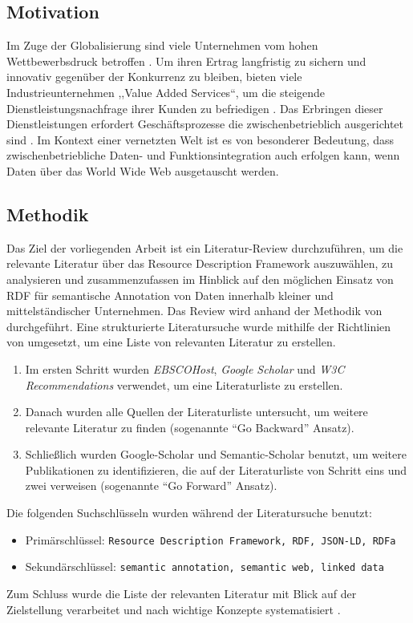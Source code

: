 \documentclass[../main.tex]{subfiles}
\begin{document}
\subsection{Motivation}
Im Zuge der Globalisierung sind viele Unternehmen vom hohen Wettbewerbsdruck betroffen \autocite[vgl.][]{alt2013handbuch}. Um ihren Ertrag langfristig zu sichern und innovativ gegenüber der Konkurrenz zu bleiben, bieten viele Industrieunternehmen ,,Value Added Services``, um die steigende Dienstleistungsnachfrage ihrer Kunden zu befriedigen \autocite[vgl.][S. 4]{Meffert2015}. Das Erbringen dieser Dienstleistungen erfordert Geschäftsprozesse die zwischenbetrieblich ausgerichtet sind \autocite[vgl.][S.19]{fleisch2001netzwerkunternehmen}. Im Kontext einer vernetzten Welt \autocite[vgl.][]{bmwi2013} ist es von besonderer Bedeutung, dass zwischenbetriebliche Daten- und Funktionsintegration auch erfolgen kann, wenn Daten über das World Wide Web ausgetauscht werden. 

\subsection{Methodik}
Das Ziel der vorliegenden Arbeit ist ein Literatur-Review durchzuführen, um die relevante Literatur über das Resource Description Framework auszuwählen, zu analysieren und zusammenzufassen im Hinblick auf den möglichen Einsatz von RDF für semantische Annotation von Daten innerhalb kleiner und mittelständischer Unternehmen. Das Review wird anhand der Methodik von \cite{fettke2006state} durchgeführt. Eine strukturierte Literatursuche wurde mithilfe der Richtlinien von \cite[S. XVI]{webster2002analyzing} umgesetzt, um eine Liste von relevanten Literatur zu erstellen. 
\begin{enumerate}
	\item Im ersten Schritt wurden \emph{EBSCOHost}, \emph{Google Scholar} und \emph{W3C Recommendations} verwendet, um eine Literaturliste zu erstellen.
	\item Danach wurden alle Quellen der Literaturliste untersucht, um weitere relevante Literatur zu finden (sogenannte \hyphenquote{german}{Go Backward} Ansatz).
	\item Schließlich wurden Google-Scholar und Semantic-Scholar benutzt, um weitere Publikationen zu identifizieren, die auf der Literaturliste von Schritt eins und zwei verweisen (sogenannte \hyphenquote{german}{Go Forward} Ansatz).
\end{enumerate}
Die folgenden Suchschlüsseln wurden während der Literatursuche benutzt:
\begin{itemize}
	\item Primärschlüssel: \texttt{Resource Description Framework, RDF, JSON-LD, RDFa}
	\item Sekundärschlüssel: \texttt{semantic annotation, semantic web, linked data}
\end{itemize}
Zum Schluss wurde die Liste der relevanten Literatur mit Blick auf der Zielstellung verarbeitet und nach wichtige Konzepte systematisiert \autocite[vgl.][S. XVI]{webster2002analyzing}.
\end{document}
